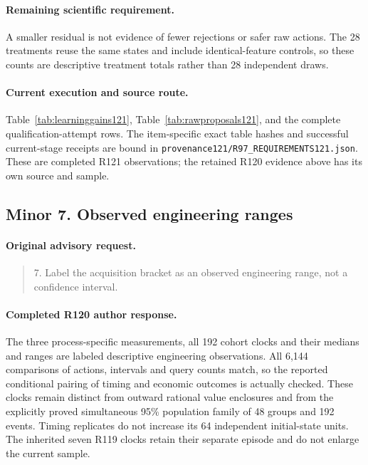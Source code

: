 \paragraph{Remaining scientific requirement.}
A smaller residual is not evidence of fewer rejections or safer raw actions. The 28 treatments reuse the same states and include identical-feature controls, so these counts are descriptive treatment totals rather than 28 independent draws.

\paragraph{Current execution and source route.}
Table~\ref{tab:learninggains121}, Table~\ref{tab:rawproposals121}, and the complete qualification-attempt rows.
The item-specific exact table hashes and successful current-stage receipts are bound in \nolinkurl{provenance121/R97_REQUIREMENTS121.json}. These are completed R121 observations; the retained R120 evidence above has its own source and sample.

\subsection{Minor 7. Observed engineering ranges}
\label{response121:minor-7}

\paragraph{Original advisory request.}
\begin{quote}
7. Label the acquisition bracket as an observed engineering range, not a confidence interval.
\end{quote}

\paragraph{Completed R120 author response.}
The three process-specific measurements, all 192 cohort clocks and their medians and ranges are labeled descriptive engineering observations. All 6,144 comparisons of actions, intervals and query counts match, so the reported conditional pairing of timing and economic outcomes is actually checked. These clocks remain distinct from outward rational value enclosures and from the explicitly proved simultaneous 95\% population family of 48 groups and 192 events. Timing replicates do not increase its 64 independent initial-state units. The inherited seven R119 clocks retain their separate episode and do not enlarge the current sample.

